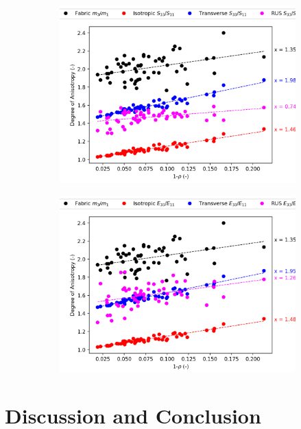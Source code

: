 \documentclass[a4paper,fleqn]{DC_ArtStyle}
\begin{document}
	\begin{figure}
		\begin{subfigure}[b]{0.45\linewidth}
			\includegraphics[width=\linewidth]{AnisotropyBVTV_S}
		\end{subfigure}
		\begin{subfigure}[b]{0.45\linewidth}
			\includegraphics[width=\linewidth]{AnisotropyBVTV_E}
		\end{subfigure}
	\end{figure}

	
	\section{Discussion and Conclusion}
	
\end{document}
